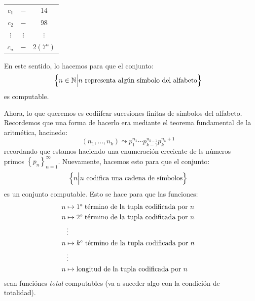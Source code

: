 \documentclass[12pt]{report}
\newcounter{it}
\theoremstyle{largebreak}
\begin{document}
    \begin{center}
        \begin{tabular}{ccc}
            \hline
            $c_1$ & $-$ & 14 \\
            $c_2$ & $-$ & 98 \\
            $\vdots$ & $\vdots$ & $\vdots$ \\
            $c_n$ & $-$ & $2(7^n)$ \\
            \hline
        \end{tabular}
    \end{center}

    En este sentido, lo hacemos para que el conjunto:
    \begin{equation*}
        \left\{n\in\mathbb{N}\Big|n\textup{ representa algún símbolo del alfabeto} \right\}
    \end{equation*}
    es computable.

    Ahora, lo que queremos es codiifcar sucesiones finitas de símbolos del alfabeto. Recordemos que una forma de hacerlo era mediante el teorema fundamental de la aritmética, hacinedo:
    \begin{equation*}
        (n_1,...,n_k)\leadsto p_1^{ n_1}\cdots p_{ k-1}^{ n_{ k-1}}p_k^{n_k+1} 
    \end{equation*}
    recordando que estamos haciendo una enumeración creciente de ls números primos $\left\{p_n \right\}_{ n=1}^\infty$. Nuevamente, hacemos esto para que el conjunto:
    \begin{equation*}
        \left\{n\Big|n\textup{ codifica una cadena de símbolos} \right\}
    \end{equation*}
    es un conjunto computable. Esto se hace para que las funciones:
    \begin{equation*}
        \begin{split}
            n&\mapsto \textup{1° término de la tupla codificada por }n\\
            n&\mapsto \textup{2° término de la tupla codificada por }n\\
             & \vdots\\
            n&\mapsto k\textup{° término de la tupla codificada por }n\\
             & \vdots \\
            n&\mapsto \textup{longitud de la tupla codificada por }n\\
        \end{split}
    \end{equation*}
    sean funciónes \textit{total} computables (va a suceder algo con la condición de totalidad).
\end{document}
